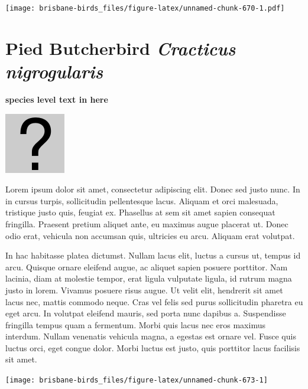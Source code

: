 \documentclass[]{book}
\let\origfigure\figure
\let\endorigfigure\endfigure
\renewenvironment{figure}[1][2] {
  \expandafter\origfigure\expandafter[H]
} {
  \endorigfigure
}
\begin{document}
\begin{figure}
\centering
\texttt{[image: brisbane-birds\_files/figure-latex/unnamed-chunk-670-1.pdf]}
\caption{\label{fig:unnamed-chunk-670}insert figure caption}
\end{figure}

\section{\texorpdfstring{Pied Butcherbird \emph{Cracticus
nigrogularis}}{Pied Butcherbird Cracticus nigrogularis}}\label{pied-butcherbird-cracticus-nigrogularis}

\textbf{species level text in here}

\begin{figure}
\centering
\includegraphics{assets/missing.png}
\caption{No image for species}
\end{figure}

Lorem ipsum dolor sit amet, consectetur adipiscing elit. Donec sed justo
nunc. In in cursus turpis, sollicitudin pellentesque lacus. Aliquam et
orci malesuada, tristique justo quis, feugiat ex. Phasellus at sem sit
amet sapien consequat fringilla. Praesent pretium aliquet ante, eu
maximus augue placerat ut. Donec odio erat, vehicula non accumsan quis,
ultricies eu arcu. Aliquam erat volutpat.

In hac habitasse platea dictumst. Nullam lacus elit, luctus a cursus ut,
tempus id arcu. Quisque ornare eleifend augue, ac aliquet sapien posuere
porttitor. Nam lacinia, diam at molestie tempor, erat ligula vulputate
ligula, id rutrum magna justo in lorem. Vivamus posuere risus augue. Ut
velit elit, hendrerit sit amet lacus nec, mattis commodo neque. Cras vel
felis sed purus sollicitudin pharetra eu eget arcu. In volutpat eleifend
mauris, sed porta nunc dapibus a. Suspendisse fringilla tempus quam a
fermentum. Morbi quis lacus nec eros maximus interdum. Nullam venenatis
vehicula magna, a egestas est ornare vel. Fusce quis luctus orci, eget
congue dolor. Morbi luctus est justo, quis porttitor lacus facilisis sit
amet.

\begin{figure}
\texttt{[image: brisbane-birds\_files/figure-latex/unnamed-chunk-673-1]} \caption{insert figure caption}\label{fig:unnamed-chunk-673}
\end{figure}
\end{document}
